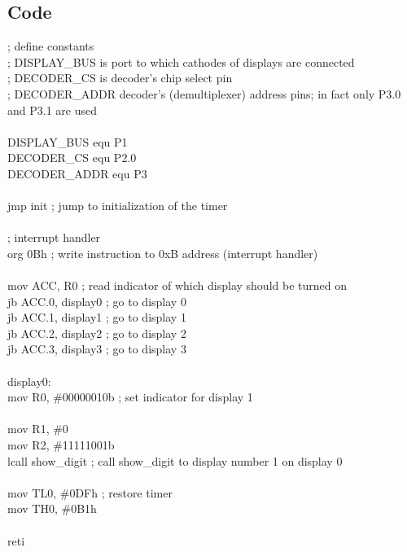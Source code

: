 \documentclass{article}
\begin{document}
\subsection{Code}
\ttfamily
; define constants\\
; DISPLAY\_BUS is port to which cathodes of displays are connected\\
; DECODER\_CS is decoder's chip select pin\\
; DECODER\_ADDR decoder's (demultiplexer) address pins; in fact only P3.0 and P3.1 are used\\
\\
DISPLAY\_BUS     equ     P1\\
DECODER\_CS      equ     P2.0\\
DECODER\_ADDR    equ     P3\\
\\
    jmp     init                ; jump to initialization of the timer\\
\\
    ; interrupt handler\\
    org     0Bh                 ; write instruction to 0xB address (interrupt handler)\\
\\
    mov     ACC, R0             ; read indicator of which display should be turned on\\
    jb      ACC.0, display0     ; go to display 0\\
    jb      ACC.1, display1     ; go to display 1\\
    jb      ACC.2, display2     ; go to display 2\\
    jb      ACC.3, display3     ; go to display 3\\
\\
display0:\\
    mov     R0, \#00000010b      ; set indicator for display 1\\
    \\
    mov     R1, \#0              \\
    mov     R2, \#11111001b\\
    lcall   show\_digit          ; call show\_digit to display number 1 on display 0\\
    \\
    mov     TL0, \#0DFh          ; restore timer\\
    mov     TH0, \#0B1h\\
\\
    reti\\
\\
\end{document}

